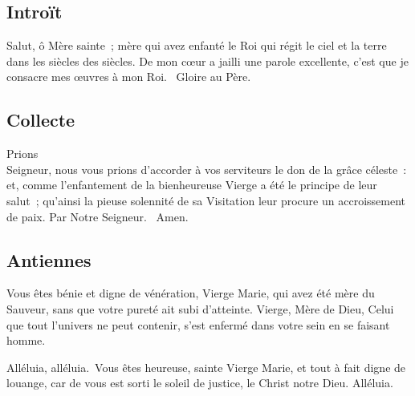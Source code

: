 


\begin{multicols}{2}
\subsection*{Introït}
{Salut, ô Mère sainte~; mère qui avez enfanté le Roi qui régit le ciel et la terre dans les siècles des siècles.}
De mon cœur a jailli une parole excellente, c’est que je consacre mes œuvres à mon Roi. \vb\ Gloire au Père.

\subsection*{Collecte}
{Prions\\
Seigneur, nous vous prions d’accorder à vos serviteurs le don de la grâce céleste~: et, comme l’enfantement de la bienheureuse Vierge a été le principe de leur salut~; qu’ainsi la pieuse solennité de sa Visitation leur procure un accroissement de paix. Par Notre Seigneur.}
{\textbf \rb\ Amen.}

\subsection*{Antiennes}
Vous êtes bénie et digne de vénération, Vierge Marie, qui avez été mère du Sauveur, sans que votre pureté ait subi d’atteinte. Vierge, Mère de Dieu, Celui que tout l’univers ne peut contenir, s’est enfermé dans votre sein en se faisant homme.

Alléluia, alléluia. \vb\ Vous êtes heureuse, sainte Vierge Marie, et tout à fait digne de louange, car de vous est sorti le soleil de justice, le Christ notre Dieu. Alléluia.


\end{multicols}
